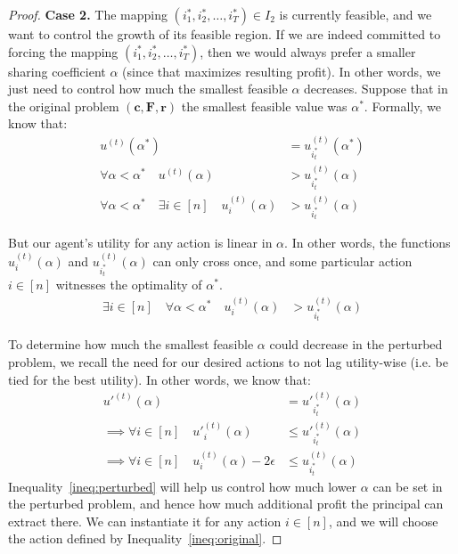 \documentclass{article}
\newcommand{\costvector}{\bm{c}}
\newcommand{\ForecastTensor}{\bm{F}}
\newcommand{\rewardvector}{\bm{r}}
\newcommand{\PrincipalAgentProblem}{\left(\costvector, \ForecastTensor, \rewardvector\right)}
\newcommand{\TransferCoefficient}{\alpha}
\newcommand{\optactionmapping}{(i^*_1, i^*_2, \ldots, i^*_T)}
\begin{document}
\begin{proof}
  \textbf{Case 2.} The mapping $\optactionmapping \in I_2$ is currently feasible, and we want to control the growth of its feasible region. If we are indeed committed to forcing the mapping $\optactionmapping$, then we would always prefer a smaller sharing coefficient $\TransferCoefficient$ (since that maximizes resulting profit). In other words, we just need to control how much the smallest feasible $\TransferCoefficient$ decreases. Suppose that in the original problem $\PrincipalAgentProblem$ the smallest feasible value was $\TransferCoefficient^*$. Formally, we know that:
  \begin{align*}
    u^{(t)}(\TransferCoefficient^*) &= u^{(t)}_{i^*_t}(\TransferCoefficient^*) \\
    \forall \TransferCoefficient < \TransferCoefficient^* \quad
    u^{(t)}(\TransferCoefficient) &> u^{(t)}_{i^*_t}(\TransferCoefficient) \\
    \forall \TransferCoefficient < \TransferCoefficient^* \quad
    \exists i \in [n] \quad
    u^{(t)}_i(\TransferCoefficient) &> u^{(t)}_{i^*_t}(\TransferCoefficient)
  \end{align*}
  
  But our agent's utility for any action is linear in $\TransferCoefficient$. In other words, the functions $u^{(t)}_i(\TransferCoefficient)$ and $u^{(t)}_{i^*_t}(\TransferCoefficient)$ can only cross once, and some particular action $i \in [n]$ witnesses the optimality of $\TransferCoefficient^*$.
  \begin{align}
    \label{ineq:original}
    \exists i \in [n] \quad
    \forall \TransferCoefficient < \TransferCoefficient^* \quad
    u^{(t)}_i(\TransferCoefficient) &> u^{(t)}_{i^*_t}(\TransferCoefficient)
  \end{align}
  
  To determine how much the smallest feasible $\TransferCoefficient$ could decrease in the perturbed problem, we recall the need for our desired actions to not lag utility-wise (i.e. be tied for the best utility). In other words, we know that:
  \begin{align}
    \nonumber
    u'^{(t)}(\TransferCoefficient) &=
    u'^{(t)}_{i^*_t}(\TransferCoefficient) \\
    \nonumber
    \implies \forall i \in [n] \quad
    u'^{(t)}_i(\TransferCoefficient) &\le
    u'^{(t)}_{i^*_t}(\TransferCoefficient) \\
    \label{ineq:perturbed}
    \implies \forall i \in [n] \quad
    u^{(t)}_i(\TransferCoefficient) - 2 \epsilon &\le
    u^{(t)}_{i^*_t}(\TransferCoefficient)
  \end{align}
  Inequality~\ref{ineq:perturbed} will help us control how much lower $\alpha$ can be set in the perturbed problem, and hence how much additional profit the principal can extract there. We can instantiate it for any action $i \in [n]$, and we will choose the action defined by Inequality~\ref{ineq:original}.
  

\end{proof}
\end{document}
